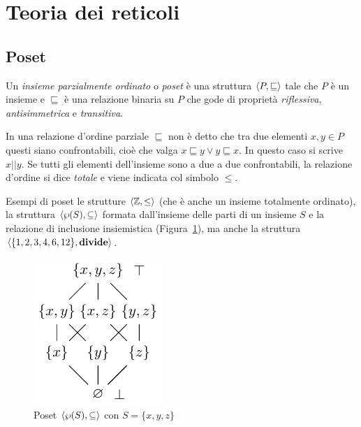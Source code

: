 \newcommand{\uco}{\fun{uco}}
\newcommand{\lfp}{\fun{lfp}}

\section{Teoria dei reticoli}

\subsection{Poset}

\begin{definition}
Un \emph{insieme parzialmente ordinato} o \emph{poset} è una struttura $\langle P, \sqsubseteq \rangle$ tale che $P$ è un insieme e $\sqsubseteq$ è una relazione binaria su $P$ che gode di proprietà \emph{riflessiva}, \emph{antisimmetrica} e \emph{transitiva}. 
\end{definition}

In una relazione d'ordine parziale $\sqsubseteq$ non è detto che tra due elementi $x,y \in P$ questi siano confrontabili, cioè che valga $x \sqsubseteq y \lor y \sqsubseteq x$. In questo caso si scrive $x || y$. Se tutti gli elementi dell'insieme sono a due a due confrontabili, la relazione d'ordine si dice \emph{totale} e viene indicata col simbolo $\le$. 

Esempi di poset le strutture $\langle \mathbb{Z}, \le \rangle$ (che è anche un insieme totalmente ordinato), la struttura $\langle \wp(S), \subseteq \rangle$ formata dall'insieme delle parti di un insieme $S$ e la relazione di inclusione insiemistica (Figura~\ref{fig:poset-parti}), ma anche la struttura $\langle \{1,2,3,4,6,12\}, \mathbf{divide} \rangle$.

\begin{figure}[htbp]
    \centering
    \includegraphics{capitoli/interpretazione-astratta/immagini/poset-parti.pdf}
    \caption{Poset $\langle \wp(S), \subseteq \rangle$ con $S = \{x,y,z\}$}
    \label{fig:poset-parti}
\end{figure}

